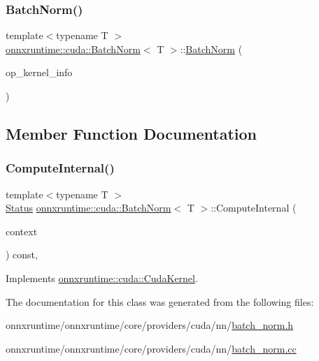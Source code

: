 \subsubsection{\texorpdfstring{Batch\+Norm()}{BatchNorm()}}
{\footnotesize\ttfamily template$<$typename T $>$ \\
\mbox{\hyperlink{classonnxruntime_1_1cuda_1_1BatchNorm}{onnxruntime\+::cuda\+::\+Batch\+Norm}}$<$ T $>$\+::\mbox{\hyperlink{classonnxruntime_1_1cuda_1_1BatchNorm}{Batch\+Norm}} (\begin{DoxyParamCaption}\item[{const \mbox{\hyperlink{classonnxruntime_1_1OpKernelInfo}{Op\+Kernel\+Info}} \&}]{op\+\_\+kernel\+\_\+info }\end{DoxyParamCaption})\hspace{0.3cm}{\ttfamily [inline]}}



\subsection{Member Function Documentation}
\mbox{\label{classonnxruntime_1_1cuda_1_1BatchNorm_a6ded0b7a7aa66e3fcc133c5e1883cf27}} 
\subsubsection{\texorpdfstring{Compute\+Internal()}{ComputeInternal()}}
{\footnotesize\ttfamily template$<$typename T $>$ \\
\mbox{\hyperlink{classonnxruntime_1_1common_1_1Status}{Status}} \mbox{\hyperlink{classonnxruntime_1_1cuda_1_1BatchNorm}{onnxruntime\+::cuda\+::\+Batch\+Norm}}$<$ T $>$\+::Compute\+Internal (\begin{DoxyParamCaption}\item[{\mbox{\hyperlink{classonnxruntime_1_1OpKernelContext}{Op\+Kernel\+Context}} $\ast$}]{context }\end{DoxyParamCaption}) const\hspace{0.3cm}{\ttfamily [override]}, {\ttfamily [virtual]}}



Implements \mbox{\hyperlink{classonnxruntime_1_1cuda_1_1CudaKernel_aca7af04ae448017d6023d30bba231ebb}{onnxruntime\+::cuda\+::\+Cuda\+Kernel}}.



The documentation for this class was generated from the following files\+:\begin{DoxyCompactItemize}
\item 
onnxruntime/onnxruntime/core/providers/cuda/nn/\mbox{\hyperlink{cuda_2nn_2batch__norm_8h}{batch\+\_\+norm.\+h}}\item 
onnxruntime/onnxruntime/core/providers/cuda/nn/\mbox{\hyperlink{cuda_2nn_2batch__norm_8cc}{batch\+\_\+norm.\+cc}}\end{DoxyCompactItemize}
